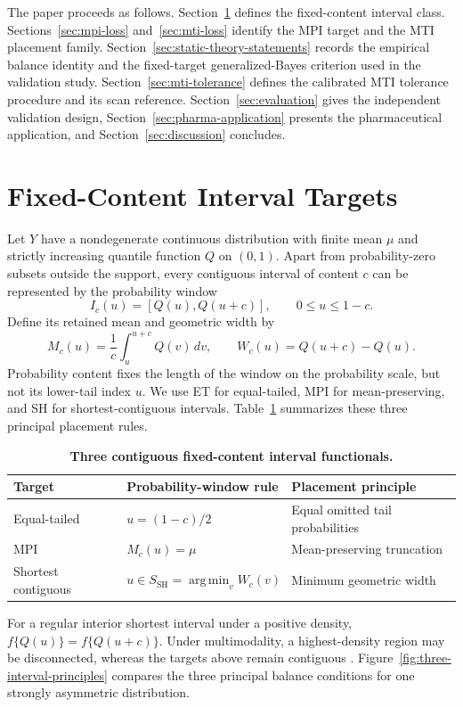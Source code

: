 \documentclass[11pt]{article}
\numberwithin{equation}{section}
\newcommand{\TableStyle}{\footnotesize\setlength{\tabcolsep}{4.5pt}\renewcommand{\arraystretch}{1.12}}
\DeclareMathOperator{\argmin}{arg\,min}
\begin{document}
The paper proceeds as follows. Section~\ref{sec:interval-functionals} defines
the fixed-content interval class. Sections~\ref{sec:mpi-loss}
and~\ref{sec:mti-loss} identify the MPI target and the MTI placement family.
Section~\ref{sec:static-theory-statements} records the empirical balance
identity and the fixed-target generalized-Bayes criterion used in the validation study.
Section~\ref{sec:mti-tolerance} defines the calibrated MTI tolerance procedure
and its scan reference. Section~\ref{sec:evaluation} gives the independent
validation design, Section~\ref{sec:pharma-application} presents the
pharmaceutical application, and Section~\ref{sec:discussion} concludes.

\section{Fixed-Content Interval Targets}
\label{sec:interval-functionals}

Let \(Y\) have a nondegenerate continuous distribution with finite mean
\(\mu\) and strictly increasing quantile function \(Q\) on \((0,1)\). Apart
from probability-zero subsets outside the support, every contiguous interval
of content \(c\) can be represented by the probability window
\[
I_c(u)=[Q(u),Q(u+c)],\qquad 0\le u\le1-c.
\]
Define its retained mean and geometric width by
\[
M_c(u)=\frac{1}{c}\int_u^{u+c}Q(v)\,dv,\qquad
W_c(u)=Q(u+c)-Q(u).
\]
Probability content fixes the length of the window on the probability scale,
but not its lower-tail index \(u\). We use ET for equal-tailed, MPI for
mean-preserving, and SH for shortest-contiguous intervals.
Table~\ref{tab:interval-functionals} summarizes these three principal
placement rules.
\begin{table}[h!]
\centering
\caption{\textbf{Three contiguous fixed-content interval functionals.}}
\label{tab:interval-functionals}
\TableStyle
\begin{tabularx}{\textwidth}{@{}>{\raggedright\arraybackslash}p{}
  >{\raggedright\arraybackslash}X
  >{\raggedright\arraybackslash}X@{}}
\toprule
Target & Probability-window rule & Placement principle\\
\midrule
Equal-tailed
& \(u=(1-c)/2\)
& Equal omitted tail probabilities\\
MPI
& \(M_c(u)=\mu\)
& Mean-preserving truncation\\
Shortest contiguous
& \(u\in S_{\mathrm{SH}}=\argmin_v W_c(v)\)
& Minimum geometric width\\
\bottomrule
\end{tabularx}
\end{table}
For a regular interior shortest interval under a positive density,
\(f\{Q(u)\}=f\{Q(u+c)\}\). Under multimodality, a highest-density region may
be disconnected, whereas the targets above remain contiguous
\citep{BrehmerGneiting2021Intervals}. Figure~\ref{fig:three-interval-principles}
compares the three principal balance conditions for one strongly asymmetric
distribution.
\end{document}
